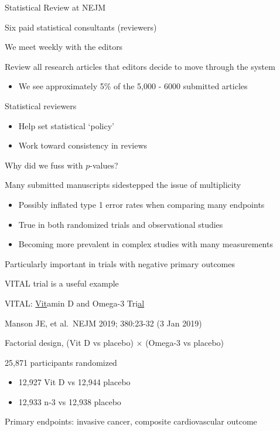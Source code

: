 \documentclass[ignorenonframetext,]{beamer}
\providecommand{\tightlist}{%
  \setlength{\itemsep}{0pt}\setlength{\parskip}{0pt}}
\begin{document}
\begin{frame}{Statistical Review at NEJM}
\protect\hypertarget{statistical-review-at-nejm}{}

Six paid statistical consultants (reviewers)

We meet weekly with the editors

Review all research articles that editors decide to move through the
system

\begin{itemize}
\tightlist
\item
  We see approximately 5\% of the 5,000 - 6000 submitted articles
\end{itemize}

Statistical reviewers

\begin{itemize}
\item
  Help set statistical `policy'
\item
  Work toward consistency in reviews
\end{itemize}

\end{frame}

\begin{frame}{Why did we fuss with \(p\)-values?}
\protect\hypertarget{why-did-we-fuss-with-p-values}{}

Many submitted manuscripts sidestepped the issue of multiplicity

\begin{itemize}
\item
  Possibly inflated type 1 error rates when comparing many endpoints
\item
  True in both randomized trials and observational studies
\item
  Becoming more prevalent in complex studies with many measurements
\end{itemize}

Particularly important in trials with negative primary outcomes

VITAL trial is a useful example

\end{frame}

\begin{frame}{VITAL: \underline{Vit}amin D and Omega-3
Tri\underline{al}}
\protect\hypertarget{vital-amin-d-and-omega-3-tri}{}

Manson JE, et al.~NEJM 2019; 380:23-32 (3 Jan 2019)

Factorial design, (Vit D vs placebo) \(\times\) (Omega-3 vs placebo)

25,871 participants randomized

\begin{itemize}
\tightlist
\item
  12,927 Vit D vs 12,944 placebo\\
\item
  12,933 n-3 vs 12,938 placebo
\end{itemize}

Primary endpoints: invasive cancer, composite cardiovascular outcome

\end{frame}
\end{document}
